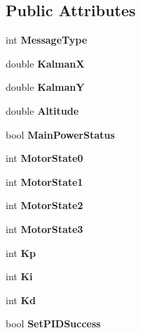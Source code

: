 \subsection*{Public Attributes}
\begin{DoxyCompactItemize}
\item 
int {\bfseries Message\-Type}\label{class_quadro__msg_ae1339b41d22e734540f5bbe99b9432a8}

\item 
double {\bfseries Kalman\-X}\label{class_quadro__msg_a1cccf8e943ddceb82caf81b2d2f8cd51}

\item 
double {\bfseries Kalman\-Y}\label{class_quadro__msg_ab9b6082204ee9997b4d9f6eb8886b424}

\item 
double {\bfseries Altitude}\label{class_quadro__msg_a300bb6903242c55dc1ca812584ca6b95}

\item 
bool {\bfseries Main\-Power\-Status}\label{class_quadro__msg_a5aef74662f9298834d7ab719ec64c5fe}

\item 
int {\bfseries Motor\-State0}\label{class_quadro__msg_a9c0b682463a2a11f959cf625014762b1}

\item 
int {\bfseries Motor\-State1}\label{class_quadro__msg_a1b69585f25ffc60a31713501217719c2}

\item 
int {\bfseries Motor\-State2}\label{class_quadro__msg_afd82373ac92fe24be8f7a1455d389ad8}

\item 
int {\bfseries Motor\-State3}\label{class_quadro__msg_a3ce4418ab197741b175db47bfa27e0dd}

\item 
int {\bfseries Kp}\label{class_quadro__msg_add35dfbf7b074a79fbfab2fdc5b42d03}

\item 
int {\bfseries Ki}\label{class_quadro__msg_a8e61618ca1ff007a341d735eebca7349}

\item 
int {\bfseries Kd}\label{class_quadro__msg_aaa6bb4ba4b154377519d8ec323907bbf}

\item 
bool {\bfseries Set\-P\-I\-D\-Success}\label{class_quadro__msg_ae467cf9dc29a026ee7baa92b46dcc18f}

\end{DoxyCompactItemize}


